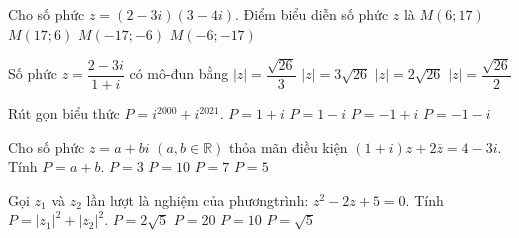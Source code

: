 \begin{ex}%
Cho số phức $z=(2-3i)(3-4i)$. Điểm biểu diễn số phức $z$ là
\choice
{$M\left(6;17\right)$}
{$M\left(17; 6\right)$}
{$M\left(-17;-6\right)$}
{\True $M\left(-6;-17\right)$}
\end{ex}
\begin{ex}%
Số phức $z=\dfrac{2-3i}{1+i}$ có mô-đun bằng
\choice
{$\left| z\right|=\dfrac{\sqrt{26}}{3}$}
{$\left| z\right|=3\sqrt{26}$}
{$\left| z\right|=2\sqrt{26}$}
{\True $\left| z\right|=\dfrac{\sqrt{26}}{2}$}
\end{ex}
\begin{ex}%
Rút gọn biểu thức $P=i^{2000}+i^{2021}$.
\choice
{\True $P=1+i$}
{$P=1-i$}
{$P=-1+i$}
{$P=-1-i$}
\end{ex}
\begin{ex}%
Cho số phức $z=a+bi$ $(a,b\in \mathbb{R})$ thỏa mãn điều kiện $(1+i)z+2\overline{z}=4-3i$. Tính $P=a+b$.
\choice
{$P=3$}
{\True $P=10$}
{$P=7$}
{$P=5$}
\end{ex}
\begin{ex}%
Gọi $z_1$ và $z_2$ lần lượt là nghiệm của phươngtrình: $z^2-2z+5=0$. Tính $P={\left| z_1\right|}^2+{\left| z_2\right|}^2$.
\choice
{\True $P=2\sqrt{5}$}
{$P=20$}
{$P=10$}
{$P=\sqrt{5}$}
\end{ex}
